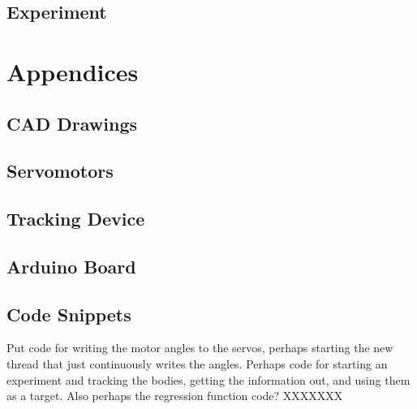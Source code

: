 \documentclass[11pt]{article}
\begin{document}
\subsection{Experiment}

\pagebreak



\pagebreak
\section{Appendices}
\subsection{CAD Drawings}
\subsection{Servomotors}
\subsection{Tracking Device}
\subsection{Arduino Board}
\subsection{Code Snippets}
Put code for writing the motor angles to the servos, perhaps starting the new thread that just continuously writes the angles. Perhaps code for starting an experiment and tracking the bodies, getting the information out, and using them as a target. Also perhaps the regression function code? XXXXXXX
\end{document}

